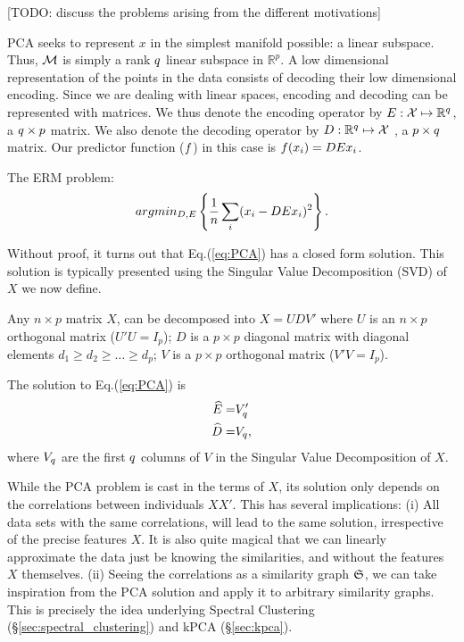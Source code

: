 [TODO: discuss the problems arising from the different motivations]

PCA seeks to represent $x$ in the simplest manifold possible: a linear subspace. Thus, $\mathcal{M}$ is simply a rank $q$ linear subspace in $\mathbb{R}^p$.
A low dimensional representation of the points in the data consists of decoding their low dimensional encoding. 
Since we are dealing with linear spaces, encoding and decoding can be represented with matrices. 
We thus denote the encoding operator by $E:\mathcal{X} \mapsto \mathbb{R}^q$, a $q \times p$ matrix.
We also denote the decoding operator by $D:\mathbb{R}^q \mapsto \mathcal{X}$ , a $p \times q$ matrix. 
Our predictor function ($f$) in this case is $f(x_i)=DE x_i$.
 
The ERM problem:
\begin{align}
\label{eq:PCA}
	argmin_{D,E}\left\{ \frac{1}{n}\sum_i (x_i-DE x_i)^2 \right\} .
\end{align}

Without proof, it turns out that Eq.(\ref{eq:PCA}) has a closed form solution. 
This solution is typically presented using the Singular Value Decomposition (SVD) of $X$ we now define.
\begin{definition}[SVD]
Any $n \times p$ matrix $X$, can be decomposed into $X=UDV'$ where 
$U$ is an $n \times p$ orthogonal matrix ($U'U=I_p$); 
$D$ is a $p \times p$ diagonal matrix with diagonal elements $d_1 \geq d_2 \geq \dots \geq d_p$;
$V$ is a $p \times p$ orthogonal matrix ($V'V=I_p$).
\end{definition}

The solution to Eq.(\ref{eq:PCA}) is 
\begin{align}
\label{eq:PCA_solution}
	\widehat{E} =& V_q' \\
	\widehat{D} =& V_q,
\end{align}
where $V_q$ are the first $q$ columns of $V$ in the Singular Value Decomposition of $X$.




\begin{remark}
\label{remark:pca_as_graph}
While the PCA problem is cast in the terms of $X$, its solution only depends on the correlations between individuals $XX'$.
This has several implications:
(i) All data sets with the same correlations, will lead to the same solution, irrespective of the precise features $X$. It is also quite magical that we can linearly approximate the data just be knowing the similarities, and without the features $X$ themselves.
(ii) Seeing the correlations as a similarity graph $\mathfrak{S}$, we can take inspiration from the PCA solution and apply it to arbitrary similarity graphs. This is precisely the idea underlying Spectral Clustering (\S\ref{sec:spectral_clustering}) and kPCA (\S\ref{sec:kpca}).
\end{remark}




